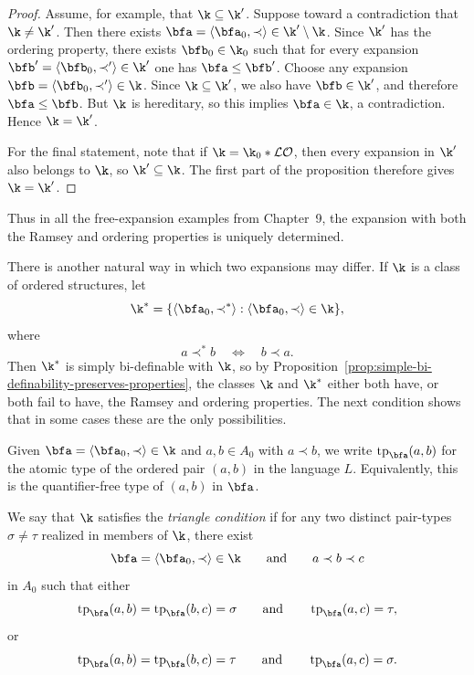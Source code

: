 \begin{proof}
    Assume, for example, that \(\k\subseteq \k'\).
    Suppose toward a contradiction that $\k\neq\k'$. Then there exists
    \(\bfa=\langle \bfa_0,\prec\rangle\in \k'\setminus \k\).
    Since $\k'$ has the ordering property, there exists
    \(\bfb_0\in \k_0\)
    such that for every expansion
    \(\bfb'=\langle \bfb_0,\prec'\rangle\in \k'\)
    one has
    \(\bfa\leq \bfb'\).
    Choose any expansion
    \(\bfb=\langle \bfb_0,\prec'\rangle\in \k\).
    Since $\k\subseteq \k'$, we also have $\bfb\in\k'$, and therefore
    \(\bfa\leq \bfb\).
    But $\k$ is hereditary, so this implies
    \(\bfa\in \k\),
    a contradiction. Hence $\k=\k'$.

    For the final statement, note that if \(\k=\k_0*\mathcal{LO}\),
    then every expansion in $\k'$ also belongs to $\k$, so
    \(\k'\subseteq \k\).
    The first part of the proposition therefore gives $\k=\k'$.
\end{proof}

Thus in all the free-expansion examples from Chapter~9, the expansion with both the Ramsey and ordering properties is uniquely determined.

There is another natural way in which two expansions may differ. If \(\k\) is a class of ordered structures, let
\[
    \k^*=\{\langle \bfa_0,\prec^*\rangle : \langle \bfa_0,\prec\rangle\in \k\},
\]
where
\[
    a\prec^* b
    \quad\Longleftrightarrow\quad
    b\prec a.
\]
Then $\k^*$ is simply bi-definable with $\k$, so by Proposition~\ref{prop:simple-bi-definability-preserves-properties}, the classes $\k$ and $\k^*$ either both have, or both fail to have, the Ramsey and ordering properties. The next condition shows that in some cases these are the only possibilities.

Given \(\bfa=\langle \bfa_0,\prec\rangle\in\k\) and \(a,b\in A_0\) with
\(a\prec b\), we write \(\operatorname{tp}_{\bfa}(a,b)\)
for the atomic type of the ordered pair $(a,b)$ in the language $L$. Equivalently, this is the quantifier-free type of $(a,b)$ in $\bfa$.

\begin{definition}
    \label{def:triangle-condition}
    We say that $\k$ satisfies the \emph{triangle condition} if for any two
    distinct pair-types \(\sigma\neq \tau\)
    realized in members of $\k$, there exist
    \[
        \bfa=\langle \bfa_0,\prec\rangle\in \k
        \qquad\text{and}\qquad
        a\prec b\prec c
    \]
    in $A_0$ such that either
    \[
        \operatorname{tp}_{\bfa}(a,b)=\operatorname{tp}_{\bfa}(b,c)=\sigma
        \qquad\text{and}\qquad
        \operatorname{tp}_{\bfa}(a,c)=\tau,
    \]
    or
    \[
        \operatorname{tp}_{\bfa}(a,b)=\operatorname{tp}_{\bfa}(b,c)=\tau
        \qquad\text{and}\qquad
        \operatorname{tp}_{\bfa}(a,c)=\sigma.
    \]
\end{definition}


